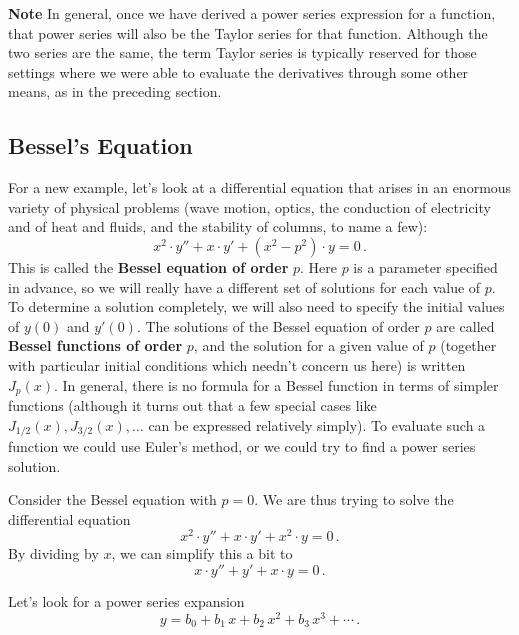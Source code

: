{{{{{\bf Note}  In general, once we have derived a power series expression for a function, that power series will also be the Taylor series for that function.  Although the two series are the same, the term Taylor series is typically reserved for those settings where we were able to evaluate the derivatives through some other means, as in the preceding section.

\subsection{Bessel's Equation}

  For a new example, let's look at a differential equation that arises in an enormous variety of physical problems (wave motion, optics, the conduction of electricity and of heat and fluids, and the stability of columns, to name a few):
\[
x^2 \cdot y'' + x \cdot y' + (x^2 - p^2) \cdot y = 0 \, .
\]
This is called the {\bf Bessel equation of order} {\boldmath $p$}.  Here $p$ is a parameter specified in advance, so we will really have a different set of solutions for each value of $p$.  To determine a solution completely, we will also need to specify the initial values of $y(0)$ and $y'(0)$.  The solutions of the Bessel equation of order $p$ are called {\bf Bessel functions of order} {\boldmath $p$}, and the solution for a given value of $p$ (together with particular initial conditions which needn't concern us here) is written $J_p(x)$.  In general, there is no formula for a Bessel function in terms of simpler functions (although it turns out that a few special cases like $J_{1/2}(x), J_{3/2}(x) , \ldots$ can be expressed relatively simply).  To evaluate such a function we could use Euler's method, or we could try to find a power series solution.


Consider the Bessel equation with $p=0$.  We are thus trying to solve the differential equation
\[
x^2 \cdot y'' + x \cdot y' + x^2  \cdot y = 0 \, .
\]
By dividing by $x$, we can simplify this a bit to
\[
x \cdot y'' + y' + x \cdot y = 0 \, .
\]

Let's look for a power series expansion
\[
y = b_0 + b_1\,x + b_2\,x^2 +b_3\,x^3 + \cdots \,.
\]

}}}}
